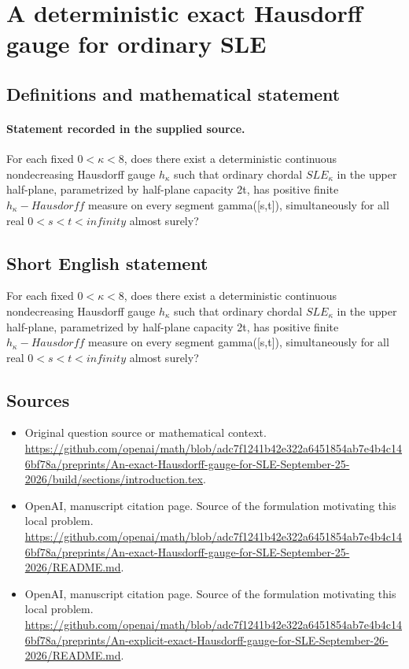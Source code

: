 \documentclass[11pt]{article}
\begin{document}
\section*{A deterministic exact Hausdorff gauge for ordinary SLE}\label{30007396}
\subsection{Definitions and mathematical statement}
\paragraph{Statement recorded in the supplied source.}
For each fixed $0<\kappa <8$, does there exist a deterministic continuous nondecreasing Hausdorff gauge $h_\kappa $ such that ordinary chordal $SLE_\kappa $ in the upper half-plane, parametrized by half-plane capacity 2t, has positive finite $h_\kappa -Hausdorff$ measure on every segment gamma([s,t]), simultaneously for all real $0<s<t<infinity$ almost surely?
\subsection{Short English statement}
For each fixed $0<\kappa <8$, does there exist a deterministic continuous nondecreasing Hausdorff gauge $h_\kappa $ such that ordinary chordal $SLE_\kappa $ in the upper half-plane, parametrized by half-plane capacity 2t, has positive finite $h_\kappa -Hausdorff$ measure on every segment gamma([s,t]), simultaneously for all real $0<s<t<infinity$ almost surely?
\subsection{Sources}
\begin{itemize}
\item[S1] Original question source or mathematical context.
\url{https://github.com/openai/math/blob/adc7f1241b42e322a6451854ab7e4b4c146bf78a/preprints/An-exact-Hausdorff-gauge-for-SLE-September-25-2026/build/sections/introduction.tex}.
\item[S2] OpenAI, manuscript citation page. Source of the formulation motivating this local problem.
\url{https://github.com/openai/math/blob/adc7f1241b42e322a6451854ab7e4b4c146bf78a/preprints/An-exact-Hausdorff-gauge-for-SLE-September-25-2026/README.md}.
\item[S3] OpenAI, manuscript citation page. Source of the formulation motivating this local problem.
\url{https://github.com/openai/math/blob/adc7f1241b42e322a6451854ab7e4b4c146bf78a/preprints/An-explicit-exact-Hausdorff-gauge-for-SLE-September-26-2026/README.md}.
\end{itemize}
\end{document}
